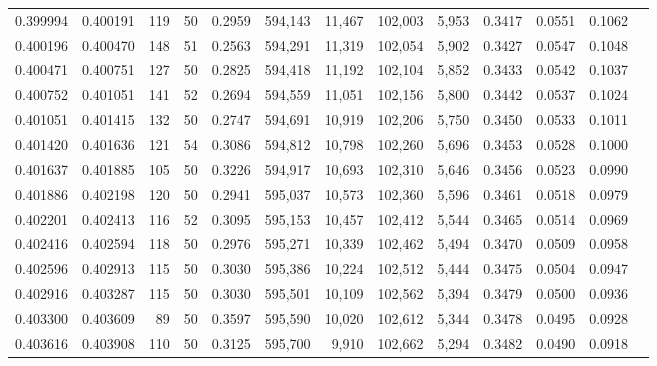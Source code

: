 \begin{tabular}{rrrrrrrrrrrrr}
0.399994 & 0.400191 &   119 &  50 &                                     0.2959 & 594,143 &  11,467 & 102,003 &   5,953 & 0.3417 & 0.0551 & 0.1062 \\
0.400196 & 0.400470 &   148 &  51 &                                     0.2563 & 594,291 &  11,319 & 102,054 &   5,902 & 0.3427 & 0.0547 & 0.1048 \\
0.400471 & 0.400751 &   127 &  50 &                                     0.2825 & 594,418 &  11,192 & 102,104 &   5,852 & 0.3433 & 0.0542 & 0.1037 \\
0.400752 & 0.401051 &   141 &  52 &                                     0.2694 & 594,559 &  11,051 & 102,156 &   5,800 & 0.3442 & 0.0537 & 0.1024 \\
0.401051 & 0.401415 &   132 &  50 &                                     0.2747 & 594,691 &  10,919 & 102,206 &   5,750 & 0.3450 & 0.0533 & 0.1011 \\
0.401420 & 0.401636 &   121 &  54 &                                     0.3086 & 594,812 &  10,798 & 102,260 &   5,696 & 0.3453 & 0.0528 & 0.1000 \\
0.401637 & 0.401885 &   105 &  50 &                                     0.3226 & 594,917 &  10,693 & 102,310 &   5,646 & 0.3456 & 0.0523 & 0.0990 \\
0.401886 & 0.402198 &   120 &  50 &                                     0.2941 & 595,037 &  10,573 & 102,360 &   5,596 & 0.3461 & 0.0518 & 0.0979 \\
0.402201 & 0.402413 &   116 &  52 &                                     0.3095 & 595,153 &  10,457 & 102,412 &   5,544 & 0.3465 & 0.0514 & 0.0969 \\
0.402416 & 0.402594 &   118 &  50 &                                     0.2976 & 595,271 &  10,339 & 102,462 &   5,494 & 0.3470 & 0.0509 & 0.0958 \\
0.402596 & 0.402913 &   115 &  50 &                                     0.3030 & 595,386 &  10,224 & 102,512 &   5,444 & 0.3475 & 0.0504 & 0.0947 \\
0.402916 & 0.403287 &   115 &  50 &                                     0.3030 & 595,501 &  10,109 & 102,562 &   5,394 & 0.3479 & 0.0500 & 0.0936 \\
0.403300 & 0.403609 &    89 &  50 &                                     0.3597 & 595,590 &  10,020 & 102,612 &   5,344 & 0.3478 & 0.0495 & 0.0928 \\
0.403616 & 0.403908 &   110 &  50 &                                     0.3125 & 595,700 &   9,910 & 102,662 &   5,294 & 0.3482 & 0.0490 & 0.0918 \\

\end{tabular}
